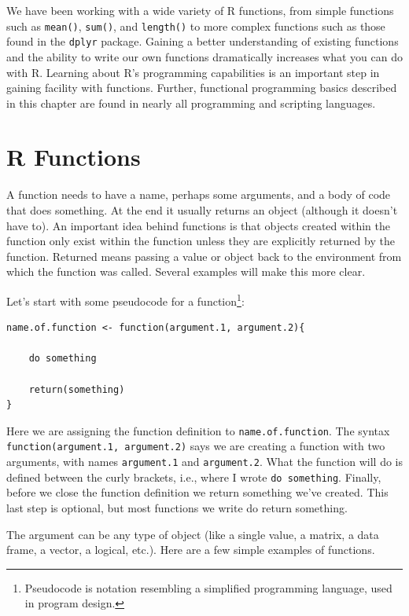 \documentclass[]{krantz}
\theoremstyle{definition}
\theoremstyle{definition}
\theoremstyle{definition}
\theoremstyle{remark}
\begin{document}
We have been working with a wide variety of R functions, from simple
functions such as \texttt{mean()}, \texttt{sum()}, and \texttt{length()}
to more complex functions such as those found in the \texttt{dplyr}
package. Gaining a better understanding of existing functions and the
ability to write our own functions dramatically increases what you can
do with R. Learning about R's programming capabilities is an important
step in gaining facility with functions. Further, functional programming
basics described in this chapter are found in nearly all programming and
scripting languages.

\section{R Functions}\label{r-functions}

A function needs to have a name, perhaps some arguments, and a body of
code that does something. At the end it usually returns an object
(although it doesn't have to). An important idea behind functions is
that objects created within the function only exist within the function
unless they are explicitly returned by the function. Returned means
passing a value or object back to the environment from which the
function was called. Several examples will make this more clear.

Let's start with some pseudocode for a function\footnote{Pseudocode is
  notation resembling a simplified programming language, used in program
  design.}:

\begin{verbatim}
name.of.function <- function(argument.1, argument.2){
  
    do something
    
    return(something)
}
\end{verbatim}

Here we are assigning the function definition to
\texttt{name.of.function}. The syntax
\texttt{function(argument.1,\ argument.2)} says we are creating a
function with two arguments, with names \texttt{argument.1} and
\texttt{argument.2}. What the function will do is defined between the
curly brackets, i.e., where I wrote \texttt{do\ something}. Finally,
before we close the function definition we return something we've
created. This last step is optional, but most functions we write do
return something.

The argument can be any type of object (like a single value, a matrix, a
data frame, a vector, a logical, etc.). Here are a few simple examples
of functions.
\end{document}

